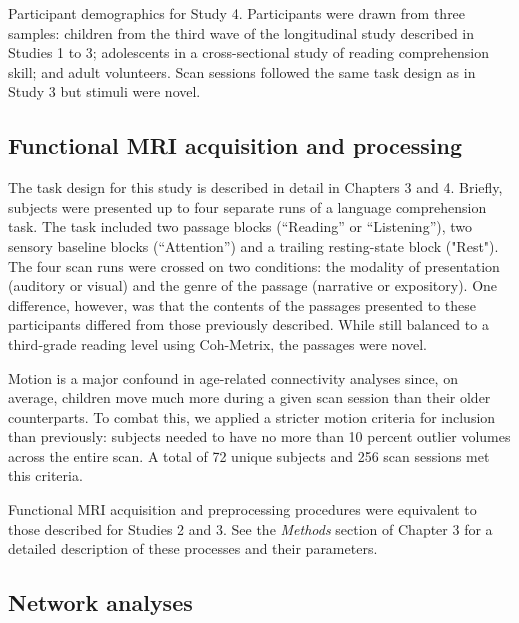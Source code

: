 \begin{table}[t]
	\renewcommand{\tabcolsep}{0.09cm}
	\centering
	
	\caption[Participant demographics for Study 4.]{Participant demographics for Study 4. Participants were drawn from three samples: children from the third wave of the longitudinal study described in Studies 1 to 3; adolescents in a cross-sectional study of reading comprehension skill; and adult volunteers. Scan sessions followed the same task design as in Study 3 but stimuli were novel.}
	\label{table:ch5-participants}
\end{table}

\subsection{Functional MRI acquisition and processing}

The task design for this study is described in detail in Chapters 3 and 4. Briefly, subjects were presented up to four separate runs of a language comprehension task. The task included two passage blocks (``Reading'' or ``Listening''), two sensory baseline blocks (``Attention'') and a trailing resting-state block ("Rest"). The four scan runs were crossed on two conditions: the modality of presentation (auditory or visual) and the genre of the passage (narrative or expository). One difference, however, was that the contents of the passages presented to these participants differed from those previously described. While still balanced to a third-grade reading level using Coh-Metrix, the passages were novel. 

Motion is a major confound in age-related connectivity analyses since, on average, children move much more during a given scan session than their older counterparts. To combat this, we applied a stricter motion criteria for inclusion than previously: subjects needed to have no more than 10 percent outlier volumes across the entire scan. A total of 72 unique subjects and 256 scan sessions met this criteria. 

Functional MRI acquisition and preprocessing procedures were equivalent to those described for Studies 2 and 3. See the \textit{Methods} section of Chapter 3 for a detailed description of these processes and their parameters.

\subsection{Network analyses}

